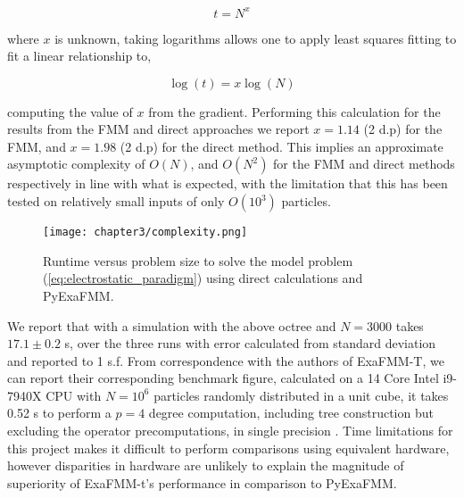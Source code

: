 \begin{equation}
    t = N^x
\end{equation}

where $x$ is unknown, taking logarithms allows one to apply least squares fitting
to fit a linear relationship to,

\begin{equation}
    \log(t) = x \log(N)
\end{equation}

computing the value of $x$ from the gradient. Performing this calculation for the
results from the \gls{FMM} and direct approaches we report $x=1.14$ (2 d.p) for
the FMM, and $x=1.98$ (2 d.p) for the direct method. This implies an approximate
asymptotic complexity of $O(N)$, and $O(N^2)$ for the \gls{FMM} and direct methods
respectively in line with what is expected, with the limitation that this has
been tested on relatively small inputs of only $O(10^3)$ particles.

\begin{figure}[ht]
    \centering

  {\texttt{[image: chapter3/complexity.png]}}
  \vspace{0pt}
    \caption{
        Runtime versus problem size to solve the model problem
        (\ref{eq:electrostatic_paradigm}) using direct calculations and
        \gls{PyExaFMM}.
    }
    \label{fig:3_1_complexity}
\end{figure}

We report that with a simulation with the above octree and
$N=3000$ takes $17.1 \pm 0.2$ s, over the three runs with
error calculated from standard deviation and reported to 1 s.f. From correspondence
with the authors of ExaFMM-T, we can report their corresponding benchmark figure,
calculated on a 14 Core Intel i9-7940X \gls{CPU} with $N=10^6$ particles
randomly distributed in a unit cube, it takes 0.52 s to perform a $p=4$ degree
computation, including tree construction but excluding the
operator precomputations, in single precision \cite{exafmm}. Time limitations for this project
makes it difficult to perform comparisons using equivalent hardware, however
disparities in hardware are unlikely to explain the magnitude of superiority
of ExaFMM-t's performance in comparison to \gls{PyExaFMM}.

